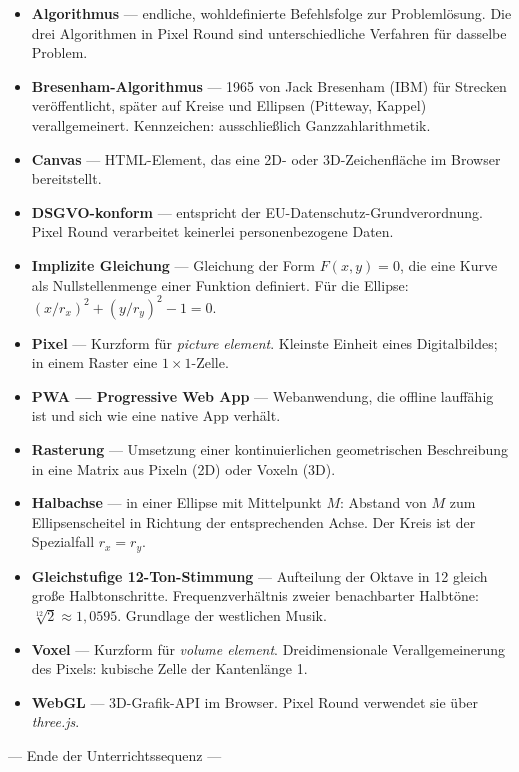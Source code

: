 \documentclass[12pt,a4paper]{scrartcl}
\newcommand{\acc}[1]{\textcolor{accent}{\textbf{#1}}}
\begin{document}
\begin{itemize}[leftmargin=1.4em,itemsep=0.3em,topsep=0.3em]
  \item \acc{Algorithmus} --- endliche, wohldefinierte Befehlsfolge zur Problemlösung. Die drei Algorithmen in Pixel Round sind unterschiedliche Verfahren für dasselbe Problem.
  \item \acc{Bresenham-Algorithmus} --- 1965 von Jack Bresenham (IBM) für Strecken veröffentlicht, später auf Kreise und Ellipsen (Pitteway, Kappel) verallgemeinert. Kennzeichen: ausschließlich Ganzzahlarithmetik.
  \item \acc{Canvas} --- HTML-Element, das eine 2D- oder 3D-Zeichenfläche im Browser bereitstellt.
  \item \acc{DSGVO-konform} --- entspricht der EU-Datenschutz-Grundverordnung. Pixel Round verarbeitet keinerlei personenbezogene Daten.
  \item \acc{Implizite Gleichung} --- Gleichung der Form $F(x, y) = 0$, die eine Kurve als Nullstellenmenge einer Funktion definiert. Für die Ellipse: $(x/r_x)^2 + (y/r_y)^2 - 1 = 0$.
  \item \acc{Pixel} --- Kurzform für \emph{picture element}. Kleinste Einheit eines Digitalbildes; in einem Raster eine $1 \times 1$-Zelle.
  \item \acc{PWA --- Progressive Web App} --- Webanwendung, die offline lauffähig ist und sich wie eine native App verhält.
  \item \acc{Rasterung} --- Umsetzung einer kontinuierlichen geometrischen Beschreibung in eine Matrix aus Pixeln (2D) oder Voxeln (3D).
  \item \acc{Halbachse} --- in einer Ellipse mit Mittelpunkt $M$: Abstand von $M$ zum Ellipsenscheitel in Richtung der entsprechenden Achse. Der Kreis ist der Spezialfall $r_x = r_y$.
  \item \acc{Gleichstufige 12-Ton-Stimmung} --- Aufteilung der Oktave in 12 gleich große Halbtonschritte. Frequenzverhältnis zweier benachbarter Halbtöne: $\sqrt[12]{2} \approx 1{,}0595$. Grundlage der westlichen Musik.
  \item \acc{Voxel} --- Kurzform für \emph{volume element}. Dreidimensionale Verallgemeinerung des Pixels: kubische Zelle der Kantenlänge 1.
  \item \acc{WebGL} --- 3D-Grafik-API im Browser. Pixel Round verwendet sie über \emph{three.js}.
\end{itemize}

\vspace{2em}
\begin{center}
\color{muted}\small\sffamily
--- Ende der Unterrichtssequenz ---
\end{center}
\end{document}
